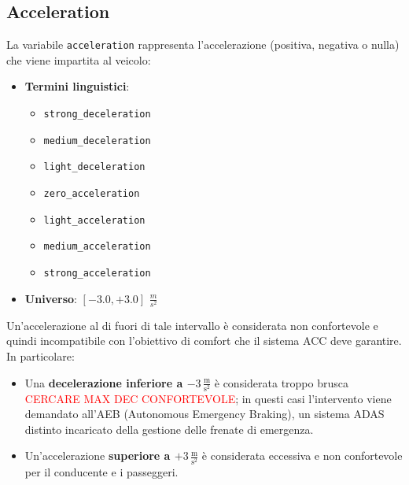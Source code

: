 \subsection{Acceleration}
La variabile \texttt{acceleration} rappresenta l'accelerazione (positiva, negativa o nulla) che viene impartita al veicolo:
\begin{itemize}
  \item \textbf{Termini linguistici}:
    \begin{itemize}
      \item \texttt{strong\_deceleration}
      \item \texttt{medium\_deceleration}
      \item \texttt{light\_deceleration}
      \item \texttt{zero\_acceleration}
      \item \texttt{light\_acceleration}
      \item \texttt{medium\_acceleration}
      \item \texttt{strong\_acceleration}
    \end{itemize}
  \item \textbf{Universo}: \([-3.0,+3.0]\) $\frac{m}{s^2}$
\end{itemize}
Un'accelerazione al di fuori di tale intervallo è considerata non confortevole e quindi incompatibile con l'obiettivo di comfort che il sistema ACC deve garantire.  
In particolare:
\begin{itemize}
  \item Una \textbf{decelerazione inferiore a \(-3\,\tfrac{\mathrm{m}}{\mathrm{s^2}}\)} è considerata troppo brusca 
  \textcolor{red}{CERCARE MAX DEC CONFORTEVOLE}; 
  in questi casi l'intervento viene demandato all'AEB (Autonomous Emergency Braking), un sistema ADAS distinto 
  incaricato della gestione delle frenate di emergenza.
  \item Un'accelerazione \textbf{superiore a \(+3\,\tfrac{\mathrm{m}}{\mathrm{s^2}}\)} è considerata eccessiva e non 
  confortevole per il conducente e i passeggeri.
\end{itemize}